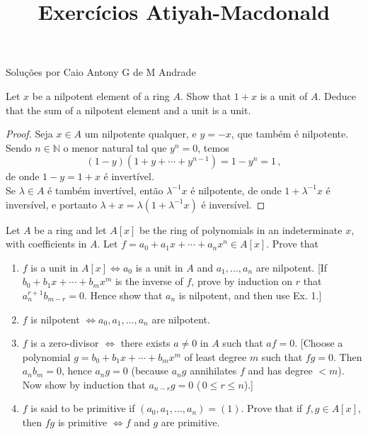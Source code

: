 \documentclass{article}
\newcommand{\NN}{\mathbb{N}}
\begin{document}
	
	\title{Exercícios Atiyah-Macdonald}
	
	
	
	\maketitle
	
	Soluções por Caio Antony G de M Andrade
	
	\exercicio Let $x$ be a nilpotent element of a ring $A$. Show that $1+x$ is a unit of $A$. Deduce that the sum of a nilpotent element and a unit is a unit.
	
	\begin{proof}
		Seja $x\in A$ um nilpotente qualquer, e $y = -x$, que também é nilpotente. Sendo $n\in\NN$ o menor natural tal que $y^n = 0$, temos
		\[
			(1 - y)(1 + y + \dotsb + y^{n-1}) = 1 - y^n = 1\,,
		\]
		de onde $1 - y = 1 + x$ é invertível.\\ 
		Se $\lambda\in A$ é também invertível, então $\lambda^{-1}x$ é nilpotente, de onde $1 + \lambda^{-1}x$ é inversível, e portanto $\lambda + x = \lambda(1 + \lambda^{-1}x)$ é inversível.
	\end{proof}
	
	
	\exercicio Let $A$ be a ring and let $A[x]$ be the ring of polynomials in an indeterminate $x$, with coefficients in $A$. Let $f = a_0 + a_1x + \dotsb + a_nx^n\in A[x]$. Prove that
	\begin{enumerate}[label = \roman*)]
	\item \label{1} $f$ is a unit in $A[x] \Leftrightarrow a_{0}$ is a unit in $A$ and $a_{1}, \ldots, a_{n}$ are nilpotent. [If $b_{0}+b_{1} x+\cdots+b_{m} x^{m}$ is the inverse of $f$, prove by induction on $r$ that $a_{n}^{r+1} b_{m-r}=0 .$ Hence show that $a_{n}$ is nilpotent, and then use Ex. 1.]
	\item \label{2} $f$ is nilpotent $\Leftrightarrow a_{0}, a_{1}, \ldots, a_{n}$ are nilpotent.
	\item \label{3} $f$ is a zero-divisor $\Leftrightarrow$ there exists $a \neq 0$ in $A$ such that $a f=0 .$ [Choose a polynomial $g=b_{0}+b_{1} x+\cdots+b_{m} x^{m}$ of least degree $m$ such that $f g=0$. Then $a_{n} b_{m}=0$, hence $a_{n} g=0$ (because $a_{n} g$ annihilates $f$ and has degree $<m$). Now show by induction that $a_{n-r} g=0$ ($\, 0 \leqslant r \leqslant n$).]
	\item \label{4} $f$ is said to be primitive if $\left(a_{0}, a_{1}, \ldots, a_{n}\right)=(1) .$ Prove that if $f, g \in A[x]$, then $f g$ is primitive $\Leftrightarrow f$ and $g$ are primitive.
	\end{enumerate}
	
\end{document}
